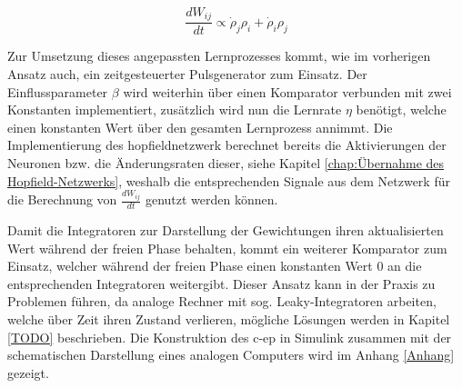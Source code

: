 \[\frac{dW_{ij}}{dt}\propto\dot{\rho}_j\rho_i+\dot{\rho}_i\rho_j\]

Zur Umsetzung dieses angepassten Lernprozesses kommt, wie im vorherigen Ansatz auch, ein zeitgesteuerter Pulsgenerator zum Einsatz. Der Einflussparameter \(\beta\) wird weiterhin über einen Komparator verbunden mit zwei Konstanten implementiert, zusätzlich wird nun die Lernrate \(\eta\) benötigt, welche einen konstanten Wert über den gesamten Lernprozess annimmt. Die Implementierung des \gls{hopfieldnetzwerk} berechnet bereits die Aktivierungen der Neuronen bzw. die Änderungsraten dieser, siehe Kapitel \ref{chap:Übernahme des Hopfield-Netzwerks}, weshalb die entsprechenden Signale aus dem Netzwerk für die Berechnung von \(\frac{dW_{ij}}{dt}\) genutzt werden können.

Damit die Integratoren zur Darstellung der Gewichtungen ihren aktualisierten Wert während der freien Phase behalten, kommt ein weiterer Komparator zum Einsatz, welcher während der freien Phase einen konstanten Wert \(0\) an die entsprechenden Integratoren weitergibt. Dieser Ansatz kann in der Praxis zu Problemen führen, da analoge Rechner mit sog. Leaky-Integratoren arbeiten, welche über Zeit ihren Zustand verlieren, mögliche Lösungen werden in Kapitel \ref{TODO} beschrieben. Die Konstruktion des \gls{c-ep} in Simulink zusammen mit der schematischen Darstellung eines analogen Computers wird im Anhang \ref{Anhang} gezeigt.
